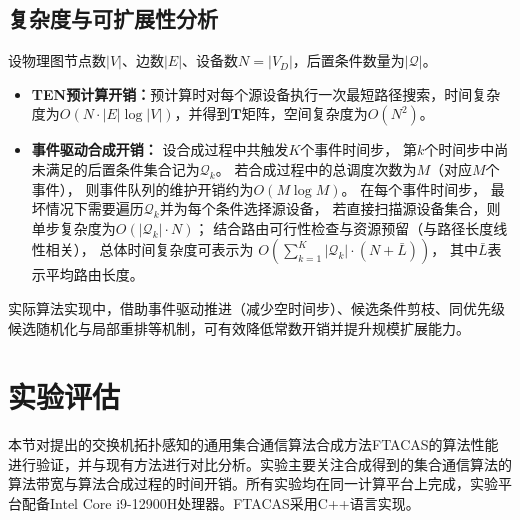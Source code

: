 \subsection{复杂度与可扩展性分析}
\label{subsec:ftacas-complexity}

设物理图节点数$|V|$、边数$|E|$、设备数$N=|V_D|$，后置条件数量为$|\mathcal{Q}|$。
\begin{itemize}
    \item \textbf{TEN预计算开销：}预计算时对每个源设备执行一次最短路径搜索，时间复杂度为$O\!\left(N\cdot |E|\log|V|\right)$，并得到$\boldsymbol{T}$矩阵，空间复杂度为$O(N^2)$。
    \item \textbf{事件驱动合成开销：}
    设合成过程中共触发$K$个事件时间步，
    第$k$个时间步中尚未满足的后置条件集合记为$\mathcal{Q}_k$。
    若合成过程中的总调度次数为$M$（对应$M$个事件），
    则事件队列的维护开销约为$O(M\log M)$。
    在每个事件时间步，
    最坏情况下需要遍历$\mathcal{Q}_k$并为每个条件选择源设备，
    若直接扫描源设备集合，则单步复杂度为$O(|\mathcal{Q}_k|\cdot N)$；
    结合路由可行性检查与资源预留（与路径长度线性相关），
    总体时间复杂度可表示为
    $O\!\left(\sum_{k=1}^{K} |\mathcal{Q}_k|\cdot (N+\bar{L})\right)$，
    其中$\bar{L}$表示平均路由长度。
\end{itemize}

实际算法实现中，借助事件驱动推进（减少空时间步）、候选条件剪枝、同优先级候选随机化与局部重排等机制，可有效降低常数开销并提升规模扩展能力。



\section{实验评估}

本节对提出的交换机拓扑感知的通用集合通信算法合成方法FTACAS的算法性能进行验证，并与现有方法进行对比分析。实验主要关注合成得到的集合通信算法的算法带宽与算法合成过程的时间开销。所有实验均在同一计算平台上完成，实验平台配备Intel Core i9-12900H处理器。FTACAS采用C++语言实现。



